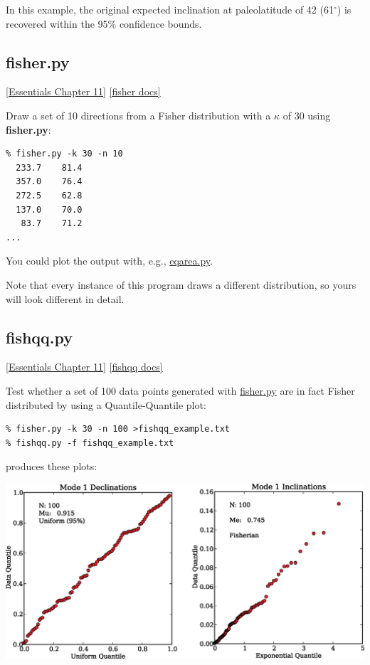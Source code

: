 \documentclass[11pt]{book}
\begin{document}
{{{In this example, the original expected inclination at paleolatitude of 42 (61$^{\circ}$) is recovered within the 95\% confidence bounds.  

%

\subsection{fisher.py}
\href{http://magician.ucsd.edu/Essentials_2/WebBook2ch11.html#ch11}{ [Essentials Chapter 11]}
\href{http://earthref.org/PmagPy/pmagpydocs/fisher-module.html}{[fisher docs]}

Draw a set of 10 directions from a Fisher distribution with a $\kappa$ of 30 using {\bf fisher.py}:

\begin{verbatim}
% fisher.py -k 30 -n 10
  233.7    81.4 
  357.0    76.4 
  272.5    62.8 
  137.0    70.0 
   83.7    71.2 
...
  \end{verbatim}
  
  You could plot the output with, e.g., \href{#eqarea.py}{eqarea.py}.  
  
  Note that every instance of this program draws a different distribution, so yours will look different in detail.  


\subsection{fishqq.py} 
\href{http://magician.ucsd.edu/Essentials_2/WebBook2ch11.html#ch11}{ [Essentials Chapter 11]}
\href{http://earthref.org/PmagPy/pmagpydocs/fishqq-module.html}{[fishqq docs]}

Test whether a set of 100 data points generated with \href{#fisher.py}{fisher.py} are in fact Fisher distributed by using a Quantile-Quantile plot:

\begin{verbatim}
% fisher.py -k 30 -n 100 >fishqq_example.txt
% fishqq.py -f fishqq_example.txt 
\end{verbatim}

\noindent produces these plots:



\includegraphics[width=15cm]{EPSfiles/fishqq-ex.eps}

}}}
\end{document}
